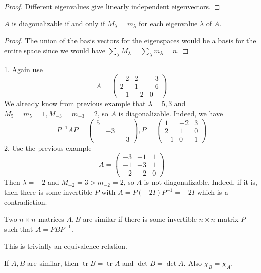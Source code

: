 \begin{proof}
    Different eigenvalues give linearly independent eigenvectors.
\end{proof}
\begin{proposition}
    $A$ is diagonalizable if and only if $M_\lambda=m_\lambda$ for each eigenvalue $\lambda$ of $A$.
\end{proposition}
\begin{proof}
    The union of the basis vectors for the eigenspaces would be a basis for the entire space since we would have $\sum_{\lambda}M_\lambda=\sum_{\lambda}m_\lambda=n$.
\end{proof}
\begin{example}
    1. Again use
    $$A=\begin{pmatrix}
        -2&2&-3\\
        2&1&-6\\
        -1&-2&0
    \end{pmatrix}$$
    We already know from previous example that $\lambda=5,3$ and $M_5=m_5=1,M_{-3}=m_{-3}=2$, so $A$ is diagonalizable.
    Indeed, we have
    $$P^{-1}AP=\begin{pmatrix}
        5&&\\
        &-3&\\
        &&-3
    \end{pmatrix},P=\begin{pmatrix}
        1&-2&3\\
        2&1&0\\
        -1&0&1
    \end{pmatrix}$$
    2. Use the previous example
    $$A=\begin{pmatrix}
        -3&-1&1\\
        -1&-3&1\\
        -2&-2&0
    \end{pmatrix}$$
    Then $\lambda=-2$ and $M_{-2}=3>m_{-2}=2$, so $A$ is not diagonalizable.
    Indeed, if it is, then there is some invertible $P$ with $A=P(-2I)P^{-1}=-2I$ which is a contradiction.
\end{example}
\begin{definition}
    Two $n\times n$ matrices $A,B$ are similar if there is some invertible $n\times n$ matrix $P$ such that $A=PBP^{-1}$.
\end{definition}
This is trivially an equivalence relation.
\begin{proposition}
    If $A,B$ are similar, then $\operatorname{tr}B=\operatorname{tr}A$ and $\det B=\det A$.
    Also $\chi_B=\chi_A$.
\end{proposition}
